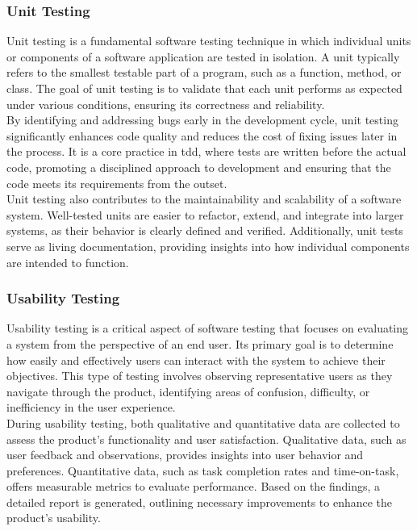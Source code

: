 \subsubsection*{Unit Testing}
\label{subsubsec:unit-testing}

Unit testing is a fundamental software testing technique in which individual units or components of a software application are tested in isolation. A unit typically refers to the smallest testable part of a program, such as a function, method, or class. The goal of unit testing is to validate that each unit performs as expected under various conditions, ensuring its correctness and reliability. \cite{geeksforgeeks:unit-test} \\

By identifying and addressing bugs early in the development cycle, unit testing significantly enhances code quality and reduces the cost of fixing issues later in the process. It is a core practice in \gls{tdd}, where tests are written before the actual code, promoting a disciplined approach to development and ensuring that the code meets its requirements from the outset. \cite{geeksforgeeks:unit-test} \\

Unit testing also contributes to the maintainability and scalability of a software system. Well-tested units are easier to refactor, extend, and integrate into larger systems, as their behavior is clearly defined and verified. Additionally, unit tests serve as living documentation, providing insights into how individual components are intended to function.

\subsubsection*{Usability Testing}
\label{subsubsec:usability-testing}

Usability testing is a critical aspect of software testing that focuses on evaluating a system from the perspective of an end user. Its primary goal is to determine how easily and effectively users can interact with the system to achieve their objectives. This type of testing involves observing representative users as they navigate through the product, identifying areas of confusion, difficulty, or inefficiency in the user experience. \cite{geeksforgeeks:user-test} \\

During usability testing, both qualitative and quantitative data are collected to assess the product's functionality and user satisfaction. Qualitative data, such as user feedback and observations, provides insights into user behavior and preferences. Quantitative data, such as task completion rates and time-on-task, offers measurable metrics to evaluate performance. Based on the findings, a detailed report is generated, outlining necessary improvements to enhance the product's usability. \cite{geeksforgeeks:user-test} \\

